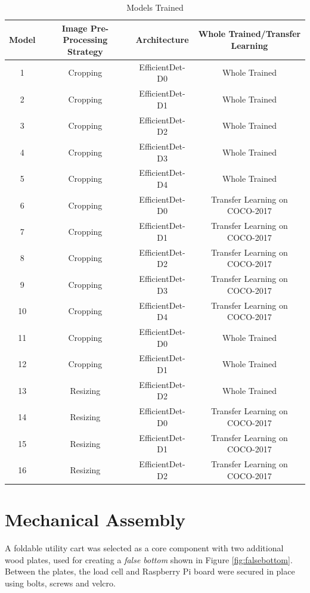 \documentclass[openright]{normas-utf-tex} %
\begin{document}
\begin{table}[H]
	\centering
	\begin{adjustbox}{width=1\textwidth}
	\label{tab:modelsTrained}
	\begin{tabular}{c|c|c|c}
		\hline 
		Model & Image Pre-Processing Strategy & Architecture & Whole Trained/Transfer Learning \\
		\hline
        1 & Cropping & EfficientDet-D0 & Whole Trained \\
		2 & Cropping & EfficientDet-D1 & Whole Trained \\
		3 & Cropping & EfficientDet-D2 & Whole Trained \\
		4 & Cropping & EfficientDet-D3 & Whole Trained \\
		5 & Cropping & EfficientDet-D4 & Whole Trained \\
		6 & Cropping & EfficientDet-D0 & Transfer Learning on COCO-2017 \\
		7 & Cropping & EfficientDet-D1 & Transfer Learning on COCO-2017 \\
		8 & Cropping & EfficientDet-D2 & Transfer Learning on COCO-2017 \\
		9 & Cropping & EfficientDet-D3 & Transfer Learning on COCO-2017 \\
		10 & Cropping & EfficientDet-D4 & Transfer Learning on COCO-2017 \\
		11 & Cropping & EfficientDet-D0 & Whole Trained \\
		12 & Cropping & EfficientDet-D1 & Whole Trained \\
		13 & Resizing & EfficientDet-D2 & Whole Trained \\
		14 & Resizing & EfficientDet-D0 & Transfer Learning on COCO-2017 \\
		15 & Resizing & EfficientDet-D1 & Transfer Learning on COCO-2017 \\
		16 & Resizing & EfficientDet-D2 & Transfer Learning on COCO-2017 \\
		\hline 
	\end{tabular}
	\end{adjustbox}
	\caption[Models Trained]{Models Trained}
	\label{tbl:modelsTrainedTab}
\end{table}

\section{Mechanical Assembly}

A foldable utility cart was selected as a core
component with two additional wood plates, used for creating a \textit{false
bottom} shown in Figure \ref{fig:falsebottom}. Between the plates, the load cell and Raspberry Pi board were secured
in place using bolts, screws and velcro.
\end{document}
